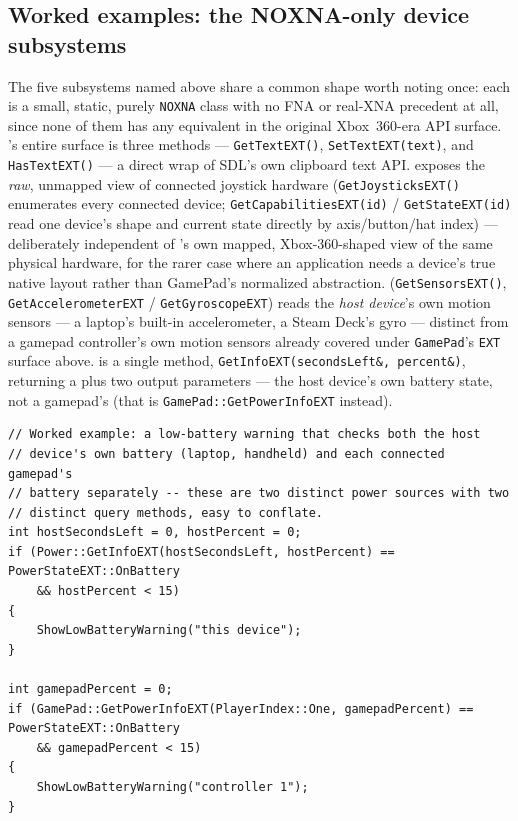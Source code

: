 \subsection{Worked examples: the NOXNA-only device subsystems}

The five subsystems named above share a common shape worth noting once: each is a small,
static, purely \texttt{NOXNA} class with no FNA or real-XNA precedent at all, since none of
them has any equivalent in the original Xbox~360-era API surface. 's
entire surface is three methods --- \texttt{GetTextEXT()}, \texttt{SetTextEXT(text)}, and
\texttt{HasTextEXT()} --- a direct wrap of SDL's own clipboard text API. 
exposes the \emph{raw}, unmapped view of connected joystick hardware
(\texttt{GetJoysticksEXT()} enumerates every connected device;
\texttt{GetCapabilitiesEXT(id)} / \texttt{GetStateEXT(id)} read one device's shape and current
state directly by axis/button/hat index) --- deliberately independent of 's
own mapped, Xbox-360-shaped view of the same physical hardware, for the rarer case where an
application needs a device's true native layout rather than GamePad's normalized
abstraction.  (\texttt{GetSensorsEXT()},
\texttt{GetAccelerometerEXT} / \texttt{GetGyroscopeEXT}) reads the \emph{host device}'s own
motion sensors --- a laptop's built-in accelerometer, a Steam Deck's gyro --- distinct from a
gamepad controller's own motion sensors already covered under \texttt{GamePad}'s
\texttt{EXT} surface above.  is a single method,
\texttt{GetInfoEXT(secondsLeft\&, percent\&)}, returning a  plus two
output parameters --- the host device's own battery state, not a gamepad's (that is
\texttt{GamePad::GetPowerInfoEXT} instead).

\begin{lstlisting}
// Worked example: a low-battery warning that checks both the host
// device's own battery (laptop, handheld) and each connected gamepad's
// battery separately -- these are two distinct power sources with two
// distinct query methods, easy to conflate.
int hostSecondsLeft = 0, hostPercent = 0;
if (Power::GetInfoEXT(hostSecondsLeft, hostPercent) == PowerStateEXT::OnBattery
    && hostPercent < 15)
{
    ShowLowBatteryWarning("this device");
}

int gamepadPercent = 0;
if (GamePad::GetPowerInfoEXT(PlayerIndex::One, gamepadPercent) == PowerStateEXT::OnBattery
    && gamepadPercent < 15)
{
    ShowLowBatteryWarning("controller 1");
}
\end{lstlisting}

